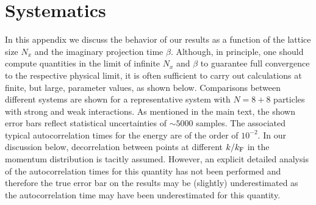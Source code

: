 \documentclass[pra,aps,groupedaddress,floatfix,twocolumn,superscriptaddress,showpacs,nofootinbib]{revtex4-1}
\newcommand{\kf}{k_\textnormal{F}}
\begin{document}
\appendix
\section{Systematics \label{app:a}}
{In this appendix} we discuss the behavior
of our results as a function of the lattice size $N_x$ and the imaginary projection time $\beta$.
Although, in principle, one should compute quantities in the limit of infinite $N_x$ and $\beta$ to
guarantee full convergence to the respective physical limit, it is often sufficient to carry out calculations at
finite, but large, parameter values, as shown below. Comparisons between different systems are shown for a representative
system {with $N=8+8$ particles} with strong and weak interactions.
{As mentioned in the main text, the shown error bars reflect statistical uncertainties of $\sim 5000$ samples.
The associated typical autocorrelation times for the energy are of the order of $10^{-2}$.
In our discussion below,
decorrelation between points at different $k / \kf$ in the momentum distribution is tacitly assumed. However, an
explicit detailed
analysis of the autocorrelation times for this quantity has not been performed
and therefore the true error bar on the results may be (slightly) underestimated as the autocorrelation
time may have been underestimated for this quantity.}

%
\end{document}
